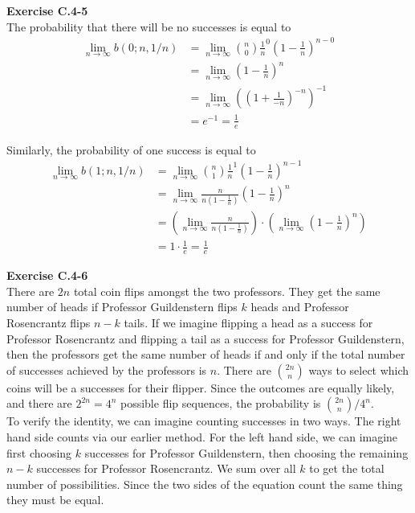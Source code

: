 \documentclass{article}
\begin{document}
\noindent\textbf{Exercise C.4-5}\\

The probability that there will be no successes is equal to 
\begin{align*}
\lim_{n\rightarrow\infty}b(0;n,1/n) &= \lim_{n\rightarrow \infty} \binom{n}{0} \frac{1}{n}^0 (1- \frac{1}{n})^{n-0}\\
 &= \lim_{n\rightarrow\infty}(1-\frac{1}{n})^n\\
 &= \lim_{n\rightarrow\infty} ((1 + \frac{1}{-n})^{-n})^{-1}\\
 &= e^{-1} = \frac{1}{e}
\end{align*}

Similarly, the probability of one success is equal to
\begin{align*}
\lim_{n\rightarrow\infty}b(1;n,1/n) &= \lim_{n\rightarrow \infty} \binom{n}{1} \frac{1}{n}^1 (1- \frac{1}{n})^{n-1}\\
&=\lim_{n\rightarrow \infty} \frac{n}{n(1-\frac{1}{n})} (1- \frac{1}{n})^{n}\\
&=\left(\lim_{n\rightarrow \infty} \frac{n}{n(1-\frac{1}{n})}\right) \cdot \left( \lim_{n\rightarrow\infty} (1- \frac{1}{n})^{n}\right)\\
&= 1 \cdot \frac{1}{e} = \frac{1}{e}
\end{align*}

\noindent\textbf{Exercise C.4-6}\\

There are $2n$ total coin flips amongst the two professors.  They get the same number of heads if Professor Guildenstern flips $k$ heads and Professor Rosencrantz flips $n-k$ tails. If we imagine flipping a head as a success for Professor Rosencrantz and flipping a tail as a success for Professor Guildenstern, then the professors get the same number of heads if and only if the total number of successes achieved by the professors is $n$.  There are ${2n \choose n}$ ways to select which coins will be a successes for their flipper.  Since the outcomes are equally likely, and there are $2^{2n} = 4^n$ possible flip sequences, the probability is ${2n \choose n} / 4^n$.  \\

To verify the identity, we can imagine counting successes in two ways.  The right hand side counts via our earlier method.  For the left hand side, we can imagine first choosing $k$ successes for Professor Guildenstern, then choosing the remaining $n-k$ successes for Professor Rosencrantz.  We sum over all $k$ to get the total number of possibilities.  Since the two sides of the equation count the same thing they must be equal. \\
\end{document}

